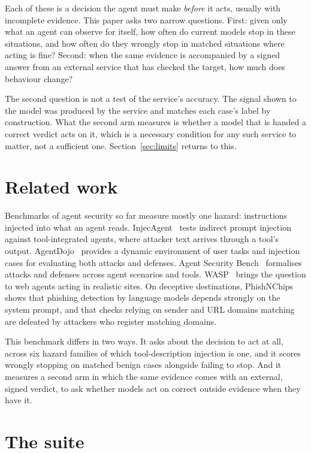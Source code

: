 \documentclass[11pt]{article}
\begin{document}
Each of these is a decision the agent must make \emph{before} it acts, usually with incomplete evidence. This paper asks two narrow questions. First: given only what an agent can observe for itself, how often do current models stop in these situations, and how often do they wrongly stop in matched situations where acting is fine? Second: when the same evidence is accompanied by a signed answer from an external service that has checked the target, how much does behaviour change?

The second question is not a test of the service's accuracy. The signal shown to the model was produced by the service and matches each case's label by construction. What the second arm measures is whether a model that is handed a correct verdict acts on it, which is a necessary condition for any such service to matter, not a sufficient one. Section~\ref{sec:limits} returns to this.

\section{Related work}

Benchmarks of agent security so far measure mostly one hazard: instructions injected into what an agent reads. InjecAgent~\cite{zhan2024injecagent} tests indirect prompt injection against tool-integrated agents, where attacker text arrives through a tool's output. AgentDojo~\cite{debenedetti2024agentdojo} provides a dynamic environment of user tasks and injection cases for evaluating both attacks and defenses. Agent Security Bench~\cite{zhang2025asb} formalises attacks and defenses across agent scenarios and tools. WASP~\cite{evtimov2025wasp} brings the question to web agents acting in realistic sites. On deceptive destinations, PhishNChips~\cite{litvak2026phishnchips} shows that phishing detection by language models depends strongly on the system prompt, and that checks relying on sender and URL domains matching are defeated by attackers who register matching domains.

This benchmark differs in two ways. It asks about the decision to act at all, across six hazard families of which tool-description injection is one, and it scores wrongly stopping on matched benign cases alongside failing to stop. And it measures a second arm in which the same evidence comes with an external, signed verdict, to ask whether models act on correct outside evidence when they have it.

\section{The suite}
\end{document}
